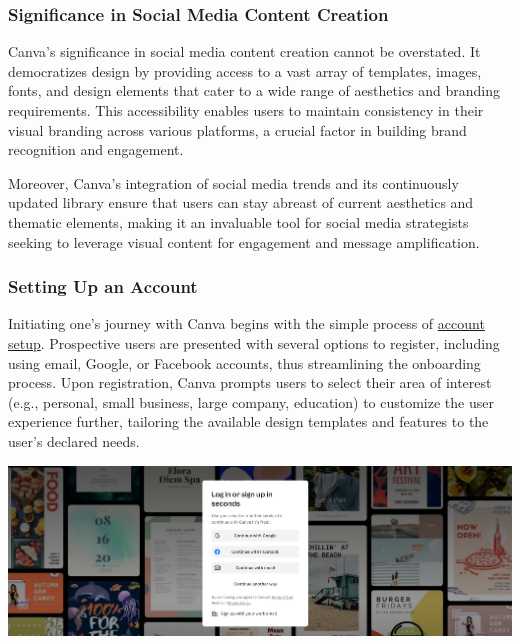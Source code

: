 \documentclass[
]{book}
\begin{document}
\hypertarget{significance-in-social-media-content-creation}{%
\subsubsection*{Significance in Social Media Content Creation}\label{significance-in-social-media-content-creation}}

Canva's significance in social media content creation cannot be overstated. It democratizes design by providing access to a vast array of templates, images, fonts, and design elements that cater to a wide range of aesthetics and branding requirements. This accessibility enables users to maintain consistency in their visual branding across various platforms, a crucial factor in building brand recognition and engagement.

Moreover, Canva's integration of social media trends and its continuously updated library ensure that users can stay abreast of current aesthetics and thematic elements, making it an invaluable tool for social media strategists seeking to leverage visual content for engagement and message amplification.

\hypertarget{setting-up-an-account}{%
\subsubsection*{Setting Up an Account}\label{setting-up-an-account}}

Initiating one's journey with Canva begins with the simple process of \href{https://www.canva.com/login/}{account setup}. Prospective users are presented with several options to register, including using email, Google, or Facebook accounts, thus streamlining the onboarding process. Upon registration, Canva prompts users to select their area of interest (e.g., personal, small business, large company, education) to customize the user experience further, tailoring the available design templates and features to the user's declared needs.

\href{https://www.canva.com/login/}{\includegraphics[width=1\textwidth,height=\textheight]{images/clipboard-1368785933.png}}
\end{document}

